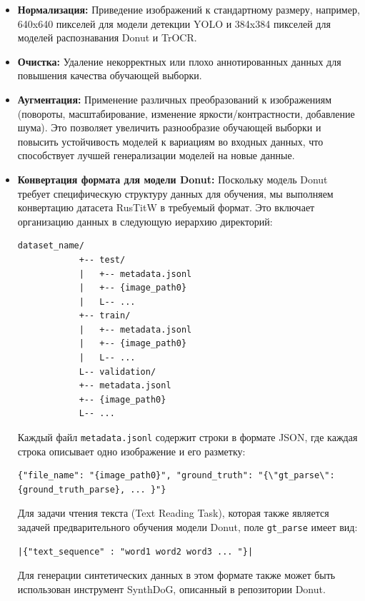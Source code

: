 \documentclass[12pt, a4paper]{article}
\theoremstyle{definition}
\theoremstyle{remark}
\begin{document}
	\begin{itemize}
		\item \textbf{Нормализация:} Приведение изображений к стандартному размеру, например, 640x640 пикселей для модели детекции YOLO и 384x384 пикселей для моделей распознавания Donut и TrOCR.
		\item \textbf{Очистка:} Удаление некорректных или плохо аннотированных данных для повышения качества обучающей выборки.
		\item \textbf{Аугментация:} Применение различных преобразований к изображениям (повороты, масштабирование, изменение яркости/контрастности, добавление шума). Это позволяет увеличить разнообразие обучающей выборки и повысить устойчивость моделей к вариациям во входных данных, что способствует лучшей генерализации моделей на новые данные.
		\item \textbf{Конвертация формата для модели Donut:} Поскольку модель Donut требует специфическую структуру данных для обучения, мы выполняем конвертацию датасета RusTitW в требуемый формат. Это включает организацию данных в следующую иерархию директорий:
		
		\begin{lstlisting}[basicstyle=\small\ttfamily\linespread{0.9}, numbers=none, frame=none, aboveskip=1ex, belowskip=1ex]
			dataset_name/
			+-- test/
			|   +-- metadata.jsonl
			|   +-- {image_path0}
			|   L-- ...
			+-- train/
			|   +-- metadata.jsonl
			|   +-- {image_path0}
			|   L-- ...
			L-- validation/
			+-- metadata.jsonl
			+-- {image_path0}
			L-- ...
		\end{lstlisting}
		Каждый файл \texttt{metadata.jsonl} содержит строки в формате JSON, где каждая строка описывает одно изображение и его разметку:
		\begin{lstlisting}[basicstyle=\small\ttfamily\linespread{0.9}, numbers=none, frame=none, aboveskip=1ex, belowskip=1ex]
			{"file_name": "{image_path0}", "ground_truth": "{\"gt_parse\": {ground_truth_parse}, ... }"}
		\end{lstlisting}
		Для задачи чтения текста (Text Reading Task), которая также является задачей предварительного обучения модели Donut, поле \texttt{gt\_parse} имеет вид: 
		\begin{lstlisting}[basicstyle=\small\ttfamily\linespread{0.9}, numbers=none, frame=none, aboveskip=1ex, belowskip=1ex]
			|{"text_sequence" : "word1 word2 word3 ... "}|
		\end{lstlisting}
		Для генерации синтетических данных в этом формате также может быть использован инструмент SynthDoG, описанный в репозитории Donut.
	\end{itemize}
	
\end{document}
